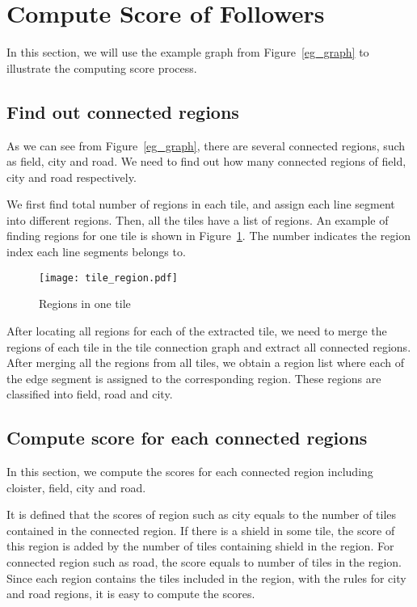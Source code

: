 \section{Compute Score of Followers}
In this section, we will use the example graph from Figure~\ref{eg_graph} to illustrate the computing score process.

\subsection{Find out connected regions}
As we can see from Figure~\ref{eg_graph}, there are several connected regions, such as field, city and road. We need to find out how many 
connected regions of field, city and road respectively. 

We first find total number of regions in each tile, and assign each line segment into different regions. Then, all the tiles have a list 
of regions. An example of finding regions for one tile is shown in Figure~\ref{tile_region}. The number indicates the region index each 
line segments belongs to.

\begin{figure}[htbp]
	  \centering
	  \texttt{[image: tile\_region.pdf]}
	  \caption{Regions in one tile}
	  \label{tile_region}
\end{figure}

After locating all regions for each of the extracted tile, we need to merge the regions of each tile in the tile connection graph and extract 
all connected regions. After merging all the regions from all tiles, we obtain a region list where each of the edge segment is assigned to 
the corresponding region. These regions are classified into field, road and city.

\subsection{Compute score for each connected regions}
In this section, we compute the scores for each connected region including cloister, field, city and road. 

It is defined that the scores of region such as city equals to the number of tiles 
contained in the connected region. If there is a shield in some tile, the score of this region is added by the number of tiles containing 
shield in the region. For connected region such as road, the score equals to number of tiles in the region. Since each region contains the tiles included in the region, with the rules for city and road regions, it is easy to compute the scores.


